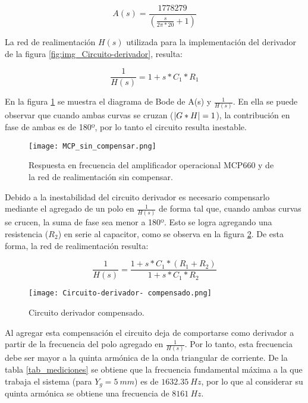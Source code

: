 \begin{equation} \label{eq_Aw_1}
	A(s)=\frac{1778279}{(\frac{s}{2\pi *20}+1)}
\end{equation} 

La red de realimentación $H(s)$ utilizada para la implementación del derivador de la figura \ref{fig:img_Circuito-derivador}, resulta:

\begin{equation} \label{eq_Aw_2}
	\frac{1}{H(s)}=1+s*C_1*R_1
\end{equation}

En la figura \ref{fig:img_MCP_sin_compensar} se muestra el diagrama de Bode de A(s) y $\frac{1}{H(s)}$. En ella se puede observar que cuando ambas curvas se cruzan ($\lvert G*H\rvert=1$), la contribución en fase de ambas es de 180º, por lo tanto el circuito resulta inestable. 

\begin{figure}[H]
	\centering
	\texttt{[image: MCP\_sin\_compensar.png]}
	\caption{Respuesta en frecuencia del amplificador operacional MCP660 y de la red de realimentación sin compensar.}
	\label{fig:img_MCP_sin_compensar}
\end{figure}

Debido a la inestabilidad del circuito derivador es necesario compensarlo mediante el agregado de un polo en $\frac{1}{H(s)}$ de forma tal que, cuando ambas curvas se crucen, la suma de fase sea menor a 180º. Esto se logra agregando una resistencia ($R_2$) en serie al capacitor, como se observa en la figura \ref{fig:img_Circuito_derivador_compensado}. De esta forma, la red de realimentación resulta:

\begin{equation} \label{eq_MCP_compensado}
	\frac{1}{H(s)}=\frac{1+s*C_1*(R_1+R_2)}{1+s*C_1*R_2}
\end{equation}

\begin{figure}[H]
	\centering
	\texttt{[image: Circuito-derivador- compensado.png]}
	\caption{Circuito derivador compensado.}
	\label{fig:img_Circuito_derivador_compensado}
\end{figure}

Al agregar esta compensación el circuito deja de comportarse como derivador a partir de la frecuencia del polo agregado en $\frac{1}{H(s)}$. Por lo tanto, esta frecuencia debe ser mayor a la quinta armónica de la onda triangular de corriente. De la tabla \ref{tab_mediciones} se obtiene que la frecuencia fundamental máxima a la que trabaja el sistema (para $Y_g=5\:mm$) es de $1632.35\:Hz$, por lo que al considerar su quinta armónica se obtiene una frecuencia de $8161\:Hz$. 

